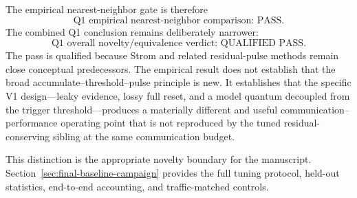 The empirical nearest-neighbor gate is therefore
\begin{equation}
    \boxed{\text{Q1 empirical nearest-neighbor comparison: PASS}.}
\end{equation}
The combined Q1 conclusion remains deliberately narrower:
\begin{equation}
    \boxed{\text{Q1 overall novelty/equivalence verdict: QUALIFIED PASS}.}
\end{equation}
The pass is qualified because Strom and related residual-pulse methods remain close conceptual predecessors. The empirical result does not establish that the broad accumulate--threshold--pulse principle is new. It establishes that the specific V1 design---leaky evidence, lossy full reset, and a model quantum decoupled from the trigger threshold---produces a materially different and useful communication--performance operating point that is not reproduced by the tuned residual-conserving sibling at the same communication budget.

This distinction is the appropriate novelty boundary for the manuscript. Section~\ref{sec:final-baseline-campaign} provides the full tuning protocol, held-out statistics, end-to-end accounting, and traffic-matched controls.
